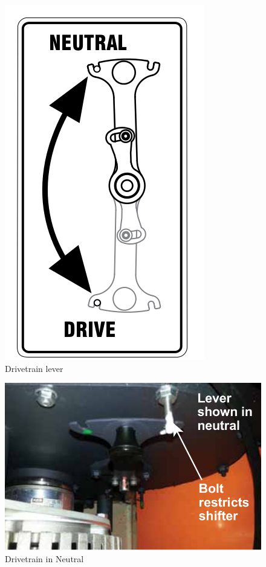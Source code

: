 \documentclass[]{clearpath-latex/clearpath-manual}
\begin{document}
\begin{figure}[!htb]
  \centering
  \includegraphics[width=0.75\linewidth]{drivetrain.png}
  \caption{Drivetrain lever}
  \label{lever}
\end{figure}


\begin{figure}[!htb]
  \centering
  \includegraphics[width=0.75\linewidth]{drivetrain-neutral.png}
  \caption{Drivetrain in Neutral}
  \label{drivetrain-n}
\end{figure}
\end{document}
